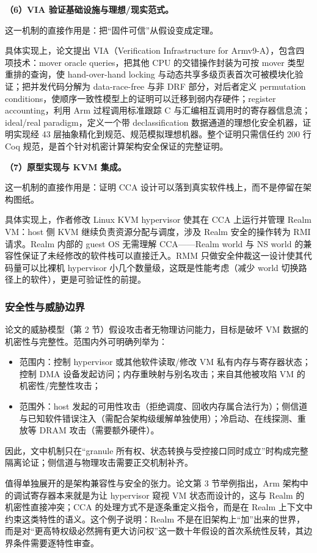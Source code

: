 \documentclass[11pt]{ctexart}
\begin{document}
\noindent\textbf{（6）VIA 验证基础设施与理想/现实范式。}\par
这一机制的直接作用是：把“固件可信”从假设变成定理。\par
具体实现上，论文提出 VIA（Verification Infrastructure for Armv9-A），包含四项技术：mover oracle queries，把其他 CPU 的交错操作封装为可按 mover 类型重排的查询，使 hand-over-hand locking 与动态共享多级页表首次可被模块化验证；把并发代码分解为 data-race-free 与非 DRF 部分，对后者定义 permutation conditions，使顺序一致性模型上的证明可以迁移到弱内存硬件；register accounting，利用 Arm 过程调用标准跟踪 C 与汇编相互调用时的寄存器信息流；ideal/real paradigm，定义一个带 declassification 数据通道的理想化安全机器，证明实现经 43 层抽象精化到规范、规范模拟理想机器。整个证明只需信任约 200 行 Coq 规范，是首个针对机密计算架构安全保证的完整证明。\par
\noindent\textbf{（7）原型实现与 KVM 集成。}\par
这一机制的直接作用是：证明 CCA 设计可以落到真实软件栈上，而不是停留在架构图纸。\par
具体实现上，作者修改 Linux KVM hypervisor 使其在 CCA 上运行并管理 Realm VM：host 侧 KVM 继续负责资源分配与调度，涉及 Realm 安全的操作转为 RMI 请求。Realm 内部的 guest OS 无需理解 CCA——Realm world 与 NS world 的兼容性保证了未经修改的软件栈可以直接迁入。RMM 只做安全仲裁这一设计使其代码量可以比裸机 hypervisor 小几个数量级，这既是性能考虑（减少 world 切换路径上的软件），更是可验证性的前提。\par
\subsubsection{安全性与威胁边界}
论文的威胁模型（第 2 节）假设攻击者无物理访问能力，目标是破坏 VM 数据的机密性与完整性。范围内外可明确列举为：
\begin{itemize}
\item 范围内：控制 hypervisor 或其他软件读取/修改 VM 私有内存与寄存器状态；控制 DMA 设备发起访问；内存重映射与别名攻击；来自其他被攻陷 VM 的机密性/完整性攻击；
\item 范围外：host 发起的可用性攻击（拒绝调度、回收内存属合法行为）；侧信道与已知软件错误注入（需配合架构级缓解单独使用）；冷启动、在线探测、重放等 DRAM 攻击（需要额外硬件）。
\end{itemize}
因此，文中机制只在“granule 所有权、状态转换与受控接口同时成立”时构成完整隔离论证；侧信道与物理攻击需要正交机制补齐。\par
值得单独展开的是架构兼容性与安全的张力。论文第 3 节举例指出，Arm 架构中的调试寄存器本来就是为让 hypervisor 窥视 VM 状态而设计的，这与 Realm 的机密性直接冲突；CCA 的处理方式不是逐条重定义指令，而是在 Realm 上下文中约束这类特性的语义。这个例子说明：Realm 不是在旧架构上“加”出来的世界，而是对“更高特权级必然拥有更大访问权”这一数十年假设的首次系统性反转，其边界条件需要逐特性审查。\par
\end{document}
